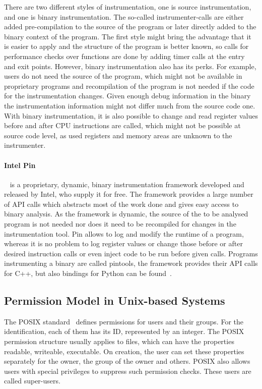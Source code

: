 There are two different styles of instrumentation, one is source
instrumentation, and one is binary instrumentation. The so-called
instrumenter-calls are either added pre-compilation to the source of the program
or later directly added to the binary context of the program. The first style
might bring the advantage that it is easier to apply and the structure of the
program is better known, so calls for performance checks over functions are done
by adding timer calls at the entry and exit points. However, binary
instrumentation also has its perks. For example, users do not need the source of
the program, which might not be available in proprietary programs and
recompilation of the program is not needed if the code for the instrumentation
changes. Given enough debug information in the binary the instrumentation
information might not differ much from the source code one. With binary
instrumentation, it is also possible to change and read register values before
and after CPU instructions are called, which might not be possible at source
code level, as used registers and memory areas are unknown to the instrumenter.

\paragraph{Intel Pin}~\cite{pintool} is a proprietary, dynamic, binary
instrumentation framework developed and released by Intel, who supply it for
free. The framework provides a large number of API calls which abstracts most of
the work done and gives easy access to binary analysis. As the framework is
dynamic, the source of the to be analysed program is not needed nor does it need
to be recompiled for changes in the instrumentation tool. Pin allows to log and
modify the runtime of a program, whereas it is no problem to log register values
or change those before or after desired instruction calls or even inject code to
be run before given calls. Programs instrumenting a binary are called pintools,
the framework provides their API calls for C++, but also bindings for Python can
be found~.


\subsection{Permission Model in Unix-based Systems}

The POSIX standard~ defines permissions for users
and their groups. For the identification, each of them has its ID, represented
by an integer. The POSIX permission structure usually applies to files, which
can have the properties readable, writeable, executable. On creation, the user
can set these properties separately for the owner, the group of the owner and
others. POSIX also allows users with special privileges to suppress such
permission checks. These users are called super-users.


